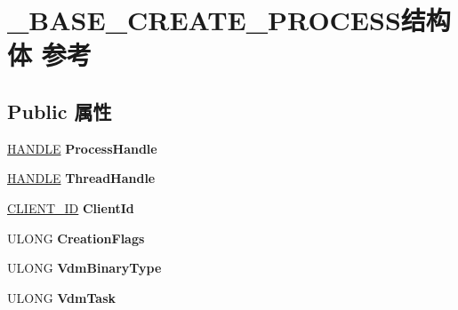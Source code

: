 \hypertarget{struct___b_a_s_e___c_r_e_a_t_e___p_r_o_c_e_s_s}{}\section{\+\_\+\+B\+A\+S\+E\+\_\+\+C\+R\+E\+A\+T\+E\+\_\+\+P\+R\+O\+C\+E\+S\+S结构体 参考}
\label{struct___b_a_s_e___c_r_e_a_t_e___p_r_o_c_e_s_s}
\subsection*{Public 属性}
\begin{DoxyCompactItemize}
\item 
\mbox{\label{struct___b_a_s_e___c_r_e_a_t_e___p_r_o_c_e_s_s_a6f369338e39d037390084dd422a3b974}} 
\hyperlink{interfacevoid}{H\+A\+N\+D\+LE} {\bfseries Process\+Handle}
\item 
\mbox{\label{struct___b_a_s_e___c_r_e_a_t_e___p_r_o_c_e_s_s_ae31ff0c035a1d003eda1df5f6d8e45ec}} 
\hyperlink{interfacevoid}{H\+A\+N\+D\+LE} {\bfseries Thread\+Handle}
\item 
\mbox{\label{struct___b_a_s_e___c_r_e_a_t_e___p_r_o_c_e_s_s_add32038fce2db0926b0f1c5e2733008d}} 
\hyperlink{struct___c_l_i_e_n_t___i_d}{C\+L\+I\+E\+N\+T\+\_\+\+ID} {\bfseries Client\+Id}
\item 
\mbox{\label{struct___b_a_s_e___c_r_e_a_t_e___p_r_o_c_e_s_s_ae4ad3a87b2d0c7f95d248788e3a8ae89}} 
U\+L\+O\+NG {\bfseries Creation\+Flags}
\item 
\mbox{\label{struct___b_a_s_e___c_r_e_a_t_e___p_r_o_c_e_s_s_a274697b4bbdda76ce4e5b884d2f5ff7b}} 
U\+L\+O\+NG {\bfseries Vdm\+Binary\+Type}
\item 
\mbox{\label{struct___b_a_s_e___c_r_e_a_t_e___p_r_o_c_e_s_s_ad396d79332539ea01da238c2edc1ddd5}} 
U\+L\+O\+NG {\bfseries Vdm\+Task}
\item 
\mbox{\label{struct___b_a_s_e___c_r_e_a_t_e___p_r_o_c_e_s_s_ae318efd5db18c5505f0ff77d49bc0eb8}} 

\end{DoxyCompactItemize}
